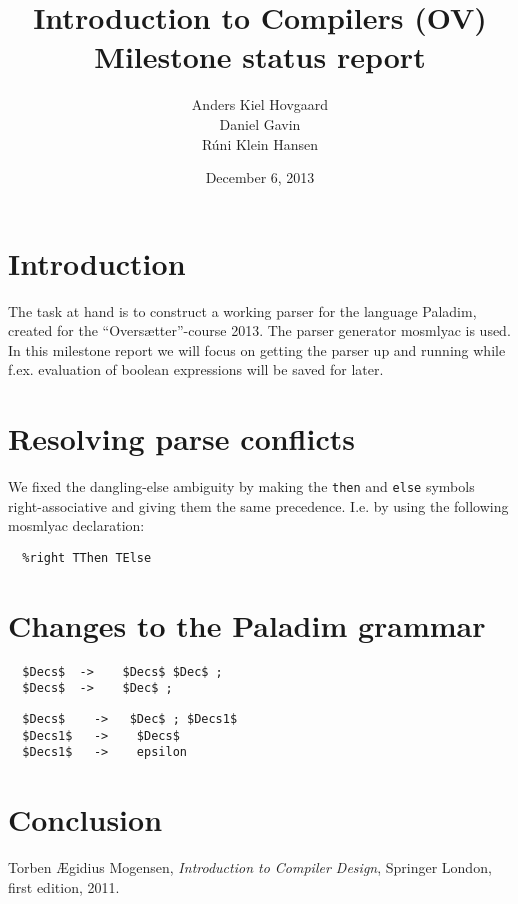 \documentclass[12pt,a4paper]{article}
\begin{document}
\title{Introduction to Compilers (OV)\\
       Milestone status report}
\author{Anders Kiel Hovgaard\\
        Daniel Gavin\\
        Rúni Klein Hansen}
\date{December 6, 2013}
\maketitle

\section{Introduction}
The task at hand is to construct a working parser for the language Paladim,
created for the ``Oversætter''-course 2013. The parser generator mosmlyac is
used.\\
In this milestone report we will focus on getting the parser up and running
while f.ex. evaluation of boolean expressions will be saved for later.

\section{Resolving parse conflicts}
We fixed the dangling-else ambiguity by making the \texttt{then} and
\texttt{else} symbols right-associative and giving them the same precedence.
I.e. by using the following mosmlyac declaration:
\begin{verbatim}
  %right TThen TElse 
\end{verbatim}

\section{Changes to the Paladim grammar}
\begin{lstlisting}
  $Decs$  ->    $Decs$ $Dec$ ;
  $Decs$  ->    $Dec$ ;
\end{lstlisting}
\begin{lstlisting}
  $Decs$    ->   $Dec$ ; $Decs1$
  $Decs1$   ->    $Decs$
  $Decs1$   ->    epsilon
\end{lstlisting}



\section{Conclusion}

\begin{thebibliography}{9}
    Torben Ægidius Mogensen,
    \emph{Introduction to Compiler Design},
    Springer London, first edition, 2011.
\end{thebibliography}
\end{document}
